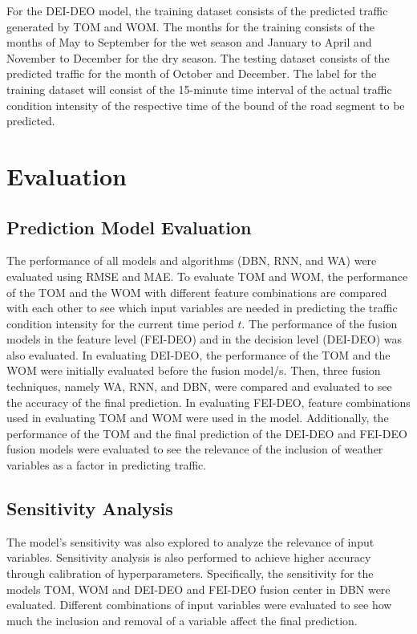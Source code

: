 For the DEI-DEO model, the training dataset consists of the predicted traffic generated by TOM and WOM. The months for the training consists of the months of May to September for the wet season and January to April and November to December for the dry season. The testing dataset consists of the predicted traffic for the month of October and December. The label for the training dataset will consist of the 15-minute time interval of the actual traffic condition intensity of the respective time of the bound of the road segment to be predicted.

\section{Evaluation}

\subsection{Prediction Model Evaluation}
The performance of all models and algorithms (DBN, RNN, and WA) were evaluated using RMSE and MAE. To evaluate TOM and WOM, the performance of the TOM and the WOM with different feature combinations are compared with each other to see which input variables are needed in predicting the traffic condition intensity for the current time period $t$. The performance of the fusion models in the feature level (FEI-DEO) and in the decision level (DEI-DEO) was also evaluated. In evaluating DEI-DEO, the performance of the TOM and the WOM were initially evaluated before the fusion model/s. Then, three fusion techniques, namely WA, RNN, and DBN, were compared and evaluated to see the accuracy of the final prediction. In evaluating FEI-DEO, feature combinations used in evaluating TOM and WOM were used in the model. Additionally, the performance of the TOM and the final prediction of the DEI-DEO and FEI-DEO fusion models were evaluated to see the relevance of the inclusion of weather variables as a factor in predicting traffic.

\subsection{Sensitivity Analysis}
The model’s sensitivity was also explored to analyze the relevance of input variables. Sensitivity analysis is also performed to achieve higher accuracy through calibration of hyperparameters. Specifically, the sensitivity for the models TOM, WOM and DEI-DEO and FEI-DEO fusion center in DBN were evaluated. Different combinations of input variables were evaluated to see how much the inclusion and removal of a variable affect the final prediction. 

